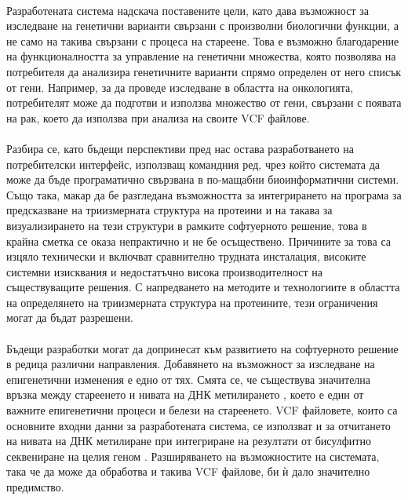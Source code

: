 \documentclass[pdftex,cyrillic,14pt,a4page,twoside,openright]{extreport}
\begin{document}
\paragraph{}
Разработената система надскача поставените цели, като дава възможност за изследване на генетични варианти свързани с произволни биологични функции, а не само на такива свързани с процеса на стареене. Това е възможно благодарение на функционалността за управление на генетични множества, която позволява на потребителя да анализира генетичните варианти спрямо определен от него списък от гени. Например, за да проведе изследване в областта на онкологията, потребителят може да подготви и използва множество от гени, свързани с появата на рак, което да използва при анализа на своите VCF файлове.

\paragraph{}
Разбира се, като бъдещи перспективи пред нас остава разработването на потребителски интерфейс, използващ командния ред, чрез който системата да може да бъде програматично свързвана в по-мащабни биоинформатични системи. Също така, макар да бе разгледана възможността за интегрирането на програма за предсказване на триизмерната структура на протеини и на такава за визуализирането на тези структури в рамките софтуерното решение, това в крайна сметка се оказа непрактично и не бе осъществено. Причините за това са изцяло технически и включват сравнително трудната инсталация, високите системни изисквания и недостатъчно висока производителност на съществуващите решения. С напредването на методите и технологиите в областта на определянето на триизмерната структура на протеините, тези ограничения могат да бъдат разрешени. 

\paragraph{}
Бъдещи разработки могат да допринесат към развитието на софтуерното решение в редица различни направления. Добавянето на възможност за изследване на епигенетични изменения е едно от тях. Смята се, че съществува значителна връзка между стареенето и нивата на ДНК метилирането \cite{michalak2019}, което е един от важните епигенетични процеси и белези на стареенето. VCF файловете, които са основните входни данни за разработената система, се използват и за отчитането на нивата на ДНК метилиране при интегриране на резултати от бисулфитно секвениране на целия геном \cite{barturen2013, merkel2018}. Разширяването на възможностите на системата, така че да може да обработва и такива VCF файлове, би ѝ дало значително предимство.
\end{document}

